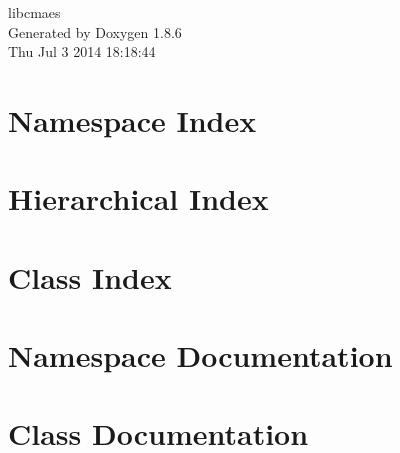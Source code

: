 \documentclass[twoside]{book}
\newcommand{\clearemptydoublepage}{%
  \newpage{\pagestyle{empty}\cleardoublepage}%
}
\begin{document}
\hypersetup{pageanchor=false}
\begin{titlepage}
\vspace*{7cm}
\begin{center}%
{\Large libcmaes }\\
\vspace*{1cm}
{\large Generated by Doxygen 1.8.6}\\
\vspace*{0.5cm}
{\small Thu Jul 3 2014 18:18:44}\\
\end{center}
\end{titlepage}
\clearemptydoublepage
\tableofcontents
\clearemptydoublepage
{}
\hypersetup{pageanchor=true}

\chapter{Namespace Index}

\chapter{Hierarchical Index}

\chapter{Class Index}

\chapter{Namespace Documentation}


\chapter{Class Documentation}

























\newpage
{}
{}
\printindex
\end{document}
